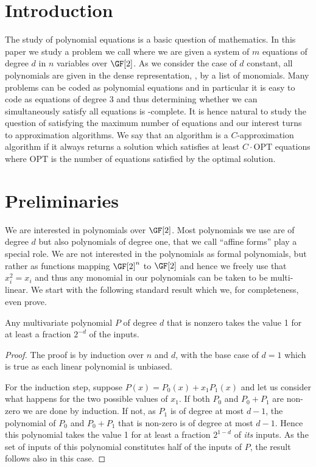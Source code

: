 \section{Introduction}

The study of polynomial equations is a basic question
of mathematics.  In this paper we study a problem we
call 
where we are given a system of $m$ equations of degree
$d$ in $n$ variables over $\GF[2]$.  As we consider the
case of $d$ constant, all polynomials are given in
the dense representation, \ie, by a list of monomials.
Many problems can be coded as polynomial equations and in particular
it is easy to code  as equations of degree 3
and thus determining whether we can simultaneously
satisfy all equations is -complete.   It is hence
natural to study
the question of satisfying the %
maximum
number of
equations and our interest turns to approximation
algorithms.  We say that an algorithm is a $C$-approximation
algorithm if it always returns a solution which satisfies
at least $C \cdot \mbox{OPT}$ equations where
$\mbox{OPT}$ is the number of equations satisfied
by the optimal solution.  

\section{Preliminaries}\label{sec: prelim}

We are interested in polynomials over $\GF[2]$.
Most polynomials we use are of
degree $d$ but also polynomials of degree one, that
we call ``affine forms'' play a special role.
We are not interested in the polynomials as formal
polynomials, but rather as functions mapping
$\GF[2]^n$ to $\GF[2]$ and hence we freely
use that $x_i^2=x_i$ and thus any
monomial in our polynomials can be taken to be multi-linear.
We start with the following standard result which we,
for completeness, even prove.

\begin{theorem}\label{thm basic deg d}
Any multivariate polynomial $P$ of degree
$d$ that is nonzero takes the
value 1 for at least a fraction
$2^{-d}$ of the inputs.
\end{theorem}


\begin{proof}
The proof is by induction over $n$ and $d$,
with the base case of $d=1$ which is true
as each linear polynomial is unbiased.

For the induction step, suppose $P(x)=P_0(x)+x_1 P_1(x)$
and let us consider what happens for the two possible
values of $x_1$.
If both $P_0$ and $P_0+P_1$ are non-zero we are
done by induction.  If not, as $P_1$ is of degree
at most $d-1$, the polynomial of $P_0$ and $P_0+P_1$ 
that is non-zero is of degree at most $d-1$.
Hence this polynomial takes the value 1 for at least a fraction $2^{1-d}$
of \emph{its} inputs.  As the set of inputs of this
polynomial constitutes half of the inputs of $P$,
the result follows also in this case.
\end{proof}

